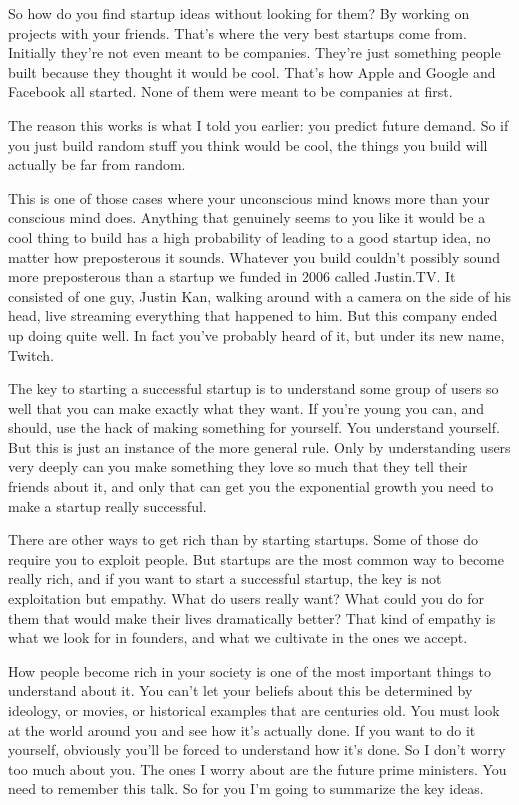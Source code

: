 \documentclass[12pt]{book}
\begin{document}
So how do you find startup ideas without looking for them? By working on
projects with your friends. That's where the very best startups come
from. Initially they're not even meant to be companies. They're just
something people built because they thought it would be cool. That's how
Apple and Google and Facebook all started. None of them were meant to be
companies at first.

The reason this works is what I told you earlier: you predict future
demand. So if you just build random stuff you think would be cool, the
things you build will actually be far from random.

This is one of those cases where your unconscious mind knows more than
your conscious mind does. Anything that genuinely seems to you like it
would be a cool thing to build has a high probability of leading to a
good startup idea, no matter how preposterous it sounds. Whatever you
build couldn't possibly sound more preposterous than a startup we funded
in 2006 called Justin.TV. It consisted of one guy, Justin Kan, walking
around with a camera on the side of his head, live streaming everything
that happened to him. But this company ended up doing quite well. In
fact you've probably heard of it, but under its new name, Twitch.

The key to starting a successful startup is to understand some group of
users so well that you can make exactly what they want. If you're young
you can, and should, use the hack of making something for yourself. You
understand yourself. But this is just an instance of the more general
rule. Only by understanding users very deeply can you make something
they love so much that they tell their friends about it, and only that
can get you the exponential growth you need to make a startup really
successful.

There are other ways to get rich than by starting startups. Some of
those do require you to exploit people. But startups are the most common
way to become really rich, and if you want to start a successful
startup, the key is not exploitation but empathy. What do users really
want? What could you do for them that would make their lives
dramatically better? That kind of empathy is what we look for in
founders, and what we cultivate in the ones we accept.

How people become rich in your society is one of the most important
things to understand about it. You can't let your beliefs about this be
determined by ideology, or movies, or historical examples that are
centuries old. You must look at the world around you and see how it's
actually done. If you want to do it yourself, obviously you'll be forced
to understand how it's done. So I don't worry too much about you. The
ones I worry about are the future prime ministers. You need to remember
this talk. So for you I'm going to summarize the key ideas.
\end{document}
